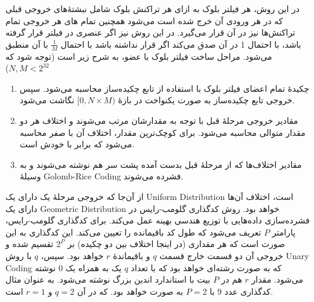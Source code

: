 در این روش، هر فیلتر بلوک به ازای هر تراکنش‌ بلوک شامل نبشتهٔ‌های خروجی قبلی که در هر ورودی‌ آن خرج شده است می‌شود همچنین تمام های هر خروجی تمام تراکنش‌ها نیز در آن قرار می‌گیرد. در این روش نیز اگر عنصری در فیلتر قرار گرفته باشد، با احتمال 1 در آن صدق می‌کند اگر قرار نداشته باشد با احتمال $\frac{1}{M}$ با آن منطبق می‌شود. مراحل ساخت فیلتر بلوک با  عضو، به شرح زیر است (توجه شود که
$N,M < 2^{32}$)
\begin{enumerate}
	\item {%
	چکیدهٔ تمام اعضای فیلتر بلوک با استفاده از تابع چکیده‌ساز  محاسبه می‌شود. سپس خروجی تابع چکیده‌ساز به صورت یکنواخت در بازهٔ 
	$[0, N\times M)$
	نگاشت می‌شود. 
}

\item {%
	مقادیر خروجی مرحلهٔ قبل با توجه به مقدارشان مرتب می‌شوند و اختلاف هر دو مقدار متوالی محاسبه می‌شود. برای کوچک‌ترین مقدار، اختلاف آن با صفر محاسبه می‌شود که برابر با خودش است.
 }

\item {%
مقادیر اختلاف‌ها که از مرحلهٔ قبل بدست آمده پشت سر هم نوشته می‌شوند و به وسیلهٔ 
\gls{Golomb-Rice Coding}
فشرده می‌شوند.
}

\end{enumerate}

از آن‌جا که خروجی مرحلهٔ یک دارای یک 
\gls{Uniform Distribution}
است،‌ اختلاف آن‌ها دارای یک 
\gls{Geometric Distribution}
خواهد بود. روش کدگذاری گلومب-رایس در فشرده‌سازی داده‌هایی با توزیع هندسی بهینه عمل می‌کند\cite{Osuntokun2-2017}. برای کدگذاری گلومب-رایس، پارامتر $P$ تعریف می‌شود که طول کد باقیمانده را تعیین می‌کند. این کد‌گذاری به این صورت است که هر مقداری (در اینجا اختلاف بین دو چکیده) بر $2^P$ تقسیم شده و خروجی آن دو قسمت خارج قسمت $q$ و باقیماندهٔ $r$ خواهد بود. سپس، $q$ با روش 
\gls{Unary Coding}
 که به صورت رشته‌ای خواهد بود که با تعداد $q$ یک به همراه یک $0$ نوشته می‌شود. مقدار $r$ هم در $P$ بیت با استاندارد اندین بزرگ نوشته می‌شود. به عنوان مثال کدگذاری عدد $9$ با $P=2$  به صورت
 خواهد بود. که در آن $q=2$ و $r=1$ است.
 
